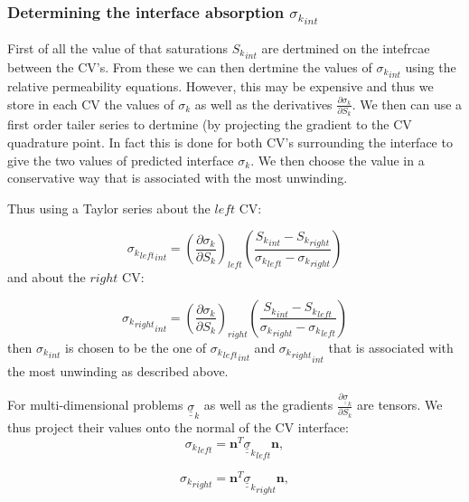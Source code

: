 \documentclass[preprint,authoryear,12pt]{elsarticle}
\begin{document}
{\subsubsection{Determining the interface absorption ${\sigma_k}_{int}$ }

First of all the value of that saturations ${S_k}_{int}$ 
are dertmined on the intefrcae between the CV's. 
From these we can then dertmine the values of ${\sigma_k}_{int}$ 
using the relative permeability equations. However, 
this may be expensive and thus we store 
in each CV the values of $\sigma_k$ as well 
as the derivatives $\frac{\partial \sigma_k}{\partial S_k}$. We then 
can use a first order tailer series to dertmine 
(by projecting the gradient 
to the CV quadrature point. In fact this is done for 
both CV's surrounding the interface to give the 
two values of predicted interface ${\sigma_k}$. 
We then choose the value in a conservative way that 
is associated with the most unwinding. 

Thus using a Taylor series about the $left$ CV:

\begin{equation}
{{\sigma_k}_{left}}_{int}
=
\left( 
\frac{\partial \sigma_k}{\partial {S_k}}
\right)_{left}
\left( 
\frac{ 
 {S_k}_{int} - {S_k}_{right} } 
{{\sigma_k}_{left} - {\sigma_k}_{right} }
\right) 
\end{equation}
and about the $right$ CV:

\begin{equation}
{{\sigma_k}_{right}}_{int}
=
\left( \frac{\partial \sigma_k}{\partial {S_k}}
\right)_{right}
\left( 
\frac{ 
 {S_k}_{int} - {S_k}_{left} } 
{{\sigma_k}_{right} - {\sigma_k}_{left} }
\right) 
\end{equation}
then ${{\sigma_k}}_{int}$ is chosen to be the one 
of ${{\sigma_k}_{left}}_{int}$ and ${{\sigma_k}_{right}}_{int}$
that is associated with the most unwinding as described above.


For multi-dimensional problems ${\underline {\underline \sigma}}_k$ as well 
as the gradients $\frac{\partial {\underline {\underline \sigma}}_k}{\partial S_k}$ 
are tensors. We thus project their values 
onto the normal of the CV interface:
\begin{equation}
{\sigma_k}_{left} = {\mathbf n}^T {{\underline {\underline \sigma}}_k}_{left} {\mathbf n},
\end{equation}

\begin{equation}
{\sigma_k}_{right} = {\mathbf n}^T {{\underline {\underline \sigma}}_k}_{right} {\mathbf n}, 
\end{equation}

}
\end{document}
